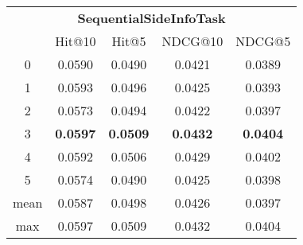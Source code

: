 \documentclass{article}
\begin{document}
 

\begin{tabular}{c|cccc}

\multicolumn{5}{c}{\textbf{SequentialSideInfoTask}} \\
\noalign{\smallskip}
\noalign{\smallskip}
\toprule
\multicolumn{1}{c}{Template ID} & \multicolumn{1}{|c}{Hit@10} & \multicolumn{1}{c}{Hit@5} & \multicolumn{1}{c}{NDCG@10} & \multicolumn{1}{c}{NDCG@5} \\
\midrule
0 & 0.0590 & 0.0490 & 0.0421 & 0.0389 \\
1 & 0.0593 & 0.0496 & 0.0425 & 0.0393 \\
2 & 0.0573 & 0.0494 & 0.0422 & 0.0397 \\
3 & \textbf{0.0597} & \textbf{0.0509} & \textbf{0.0432} & \textbf{0.0404} \\
4 & 0.0592 & 0.0506 & 0.0429 & 0.0402 \\
5 & 0.0574 & 0.0490 & 0.0425 & 0.0398 \\
\midrule
mean & 0.0587 & 0.0498 & 0.0426 & 0.0397 \\
max & 0.0597 & 0.0509 & 0.0432 & 0.0404 \\
\bottomrule

\end{tabular}
\end{document}
